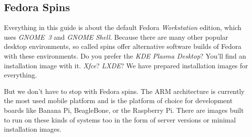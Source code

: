 \subsection*{Fedora Spins}

Everything in this guide is about the default Fedora \emph{Workstation} edition, which uses \emph{GNOME~3} and \emph{GNOME Shell}. Because there are many other popular desktop environments, so called spins offer alternative software builds of Fedora with these environments. Do you prefer the \emph{KDE Plasma Desktop}? You'll find an installation image with it. \emph{Xfce}? \emph{LXDE}? We have prepared installation images for everything.

But we don't have to stop with Fedora spins. The ARM architecture is currently the most used mobile platform and is the platform of choice for development boards like Banana Pi, BeagleBone, or the Raspberry Pi. There are images built to run on these kinds of systems too in the form of server versions or minimal installation images.
\endinput
